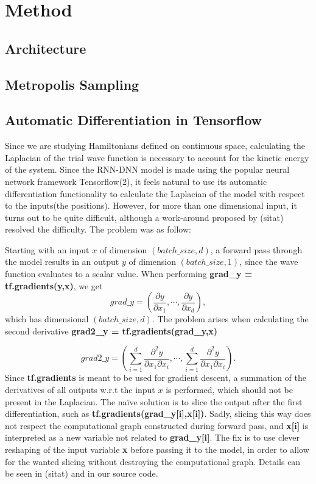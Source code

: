 \section{Method}\label{sec:Method}
\subsection{Architecture}


\subsection{Metropolis Sampling}


\subsection{Automatic Differentiation in Tensorflow}
Since we are studying Hamiltonians defined on continuous space, calculating the Laplacian of the trial wave function is necessary to account for the kinetic energy of the system. Since the RNN-DNN model is made using the popular neural network framework Tensorflow(2), it feels natural to use its automatic differentiation functionality to calculate the Laplacian of the model with respect to the inputs(the positions). However, for more than one dimensional input, it turns out to be quite difficult, although a work-around proposed by (sitat) resolved the difficulty. The problem was as follow: 

Starting with an input $x$ of dimension $(batch\_size, d)$, a forward pass through the model results in an output $y$ of dimension $(batch\_size, 1)$, since the wave function evaluates to a scalar value. When performing \textbf{grad\_y = tf.gradients(y,x)}, we get 
\begin{equation*}
	grad\_y = \left(\frac{\partial y}{\partial x_1}, \cdots, \frac{\partial y}{\partial x_d}\right),
\end{equation*}
which has dimensional $(batch\_size, d)$. The problem arises when calculating the second derivative \textbf{grad2\_y = tf.gradients(grad\_y,x)}

\begin{equation*}
	grad2\_y = \left(\sum_{i=1}^{d}\frac{\partial^2 y}{\partial x_1 \partial x_i}, \cdots, \sum_{i=1}^{d}\frac{\partial^2 y}{\partial x_1 \partial x_i}\right).
\end{equation*}
Since \textbf{tf.gradients} is meant to be used for gradient descent, a summation of the derivatives of all outputs w.r.t the input $x$ is performed, which should not be present in the Laplacian.
The naïve solution is to slice the output after the first differentiation, such as\newline 
\textbf{tf.gradients(grad\_y[i],x[i])}. Sadly, slicing this way does not respect the computational graph constructed during forward pass, and \textbf{x[i]} is interpreted as a new variable not related to \textbf{grad\_y[i]}. The fix is to use clever reshaping of the input variable \textbf{x} before passing it to the model, in order to allow for the wanted slicing without destroying the computational graph. Details can be seen in (sitat) and in our source code. 

